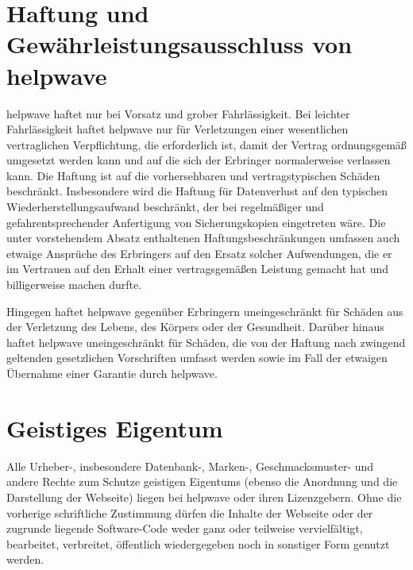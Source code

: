 \documentclass[10pt]{article}
\begin{document}
\section{Haftung und Gewährleistungsausschluss von helpwave}
helpwave haftet nur bei Vorsatz und grober Fahrlässigkeit. Bei leichter Fahrlässigkeit haftet helpwave nur für Verletzungen
einer wesentlichen vertraglichen Verpflichtung, die erforderlich ist, damit der Vertrag ordnungsgemäß umgesetzt werden
kann und auf die sich der Erbringer normalerweise verlassen kann. Die Haftung ist auf die vorhersehbaren und vertragstypischen Schäden beschränkt. Insbesondere wird die Haftung für Datenverlust auf den typischen Wiederherstellungsaufwand
beschränkt, der bei regelmäßiger und gefahrentsprechender Anfertigung von Sicherungskopien eingetreten wäre.
Die unter vorstehendem Absatz enthaltenen Haftungsbeschränkungen umfassen auch etwaige Ansprüche des Erbringers
auf den Ersatz solcher Aufwendungen, die er im Vertrauen auf den Erhalt einer vertragsgemäßen Leistung gemacht hat und
billigerweise machen durfte.

Hingegen haftet helpwave gegenüber Erbringern uneingeschränkt für Schäden aus der Verletzung des Lebens, des Körpers
oder der Gesundheit. Darüber hinaus haftet helpwave uneingeschränkt für Schäden, die von der Haftung nach zwingend
geltenden gesetzlichen Vorschriften umfasst werden sowie im Fall der etwaigen Übernahme einer Garantie durch helpwave.

\section{Geistiges Eigentum}
Alle Urheber-, insbesondere Datenbank-, Marken-, Geschmacksmuster- und andere Rechte zum Schutze geistigen Eigentums
(ebenso die Anordnung und die Darstellung der Webseite) liegen bei helpwave oder ihren Lizenzgebern. Ohne die vorherige
schriftliche Zustimmung dürfen die Inhalte der Webseite oder der zugrunde liegende Software-Code weder ganz oder teilweise vervielfältigt, bearbeitet, verbreitet, öffentlich wiedergegeben noch in sonstiger Form genutzt werden.
\end{document}
